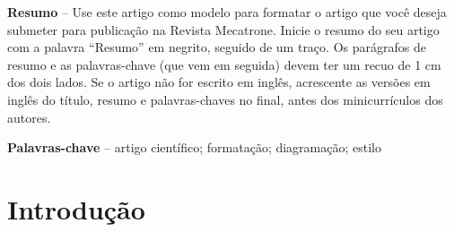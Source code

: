 \documentclass[
	article,			%
	12pt,				%
	oneside,			%
	a4paper,			%
	english,			%
	brazil,				%
	sumario=tradicional
	]{abntex2}
\begin{document}
\textual

\pagestyle{meuestilo}

\frenchspacing 

\maketitle

\thispagestyle{meuestilo}

\begin{changemargin}{1cm}{1cm} 
 \textbf{Resumo} – Use este artigo como modelo para formatar o artigo que você deseja submeter para publicação na Revista Mecatrone.  Inicie o resumo do seu artigo com a palavra “Resumo” em negrito, seguido de um traço.  Os parágrafos de resumo e as palavras-chave (que vem em seguida) devem ter um recuo de 1 cm dos dois lados. Se o artigo não for escrito em inglês, acrescente as versões em inglês do título, resumo e palavras-chaves no final, antes dos minicurrículos dos autores.

 \vspace{\onelineskip}
 
 \noindent
 \textbf{Palavras-chave} – artigo científico; formatação; diagramação; estilo 
\end{changemargin}


\section{Introdução}

\let\thefootnote\relax{}
\let\thefootnote\svthefootnote
\end{document}
